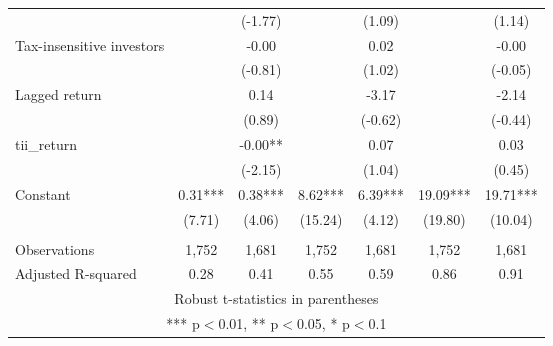 \documentclass[]{article}
\begin{document}
\begin{tabular}{lcccccc}
 &  & (-1.77) &  & (1.09) &  & (1.14) \\
Tax-insensitive investors &  & -0.00 &  & 0.02 &  & -0.00 \\
 &  & (-0.81) &  & (1.02) &  & (-0.05) \\
Lagged return &  & 0.14 &  & -3.17 &  & -2.14 \\
 &  & (0.89) &  & (-0.62) &  & (-0.44) \\
tii\_return &  & -0.00** &  & 0.07 &  & 0.03 \\
 &  & (-2.15) &  & (1.04) &  & (0.45) \\
Constant & 0.31*** & 0.38*** & 8.62*** & 6.39*** & 19.09*** & 19.71*** \\
 & (7.71) & (4.06) & (15.24) & (4.12) & (19.80) & (10.04) \\
 &  &  &  &  &  &  \\
Observations & 1,752 & 1,681 & 1,752 & 1,681 & 1,752 & 1,681 \\
 Adjusted R-squared & 0.28 & 0.41 & 0.55 & 0.59 & 0.86 & 0.91 \\ \hline
\multicolumn{7}{c}{ Robust t-statistics in parentheses} \\
\multicolumn{7}{c}{ *** p$<$0.01, ** p$<$0.05, * p$<$0.1} \\
\end{tabular}
\end{document}

